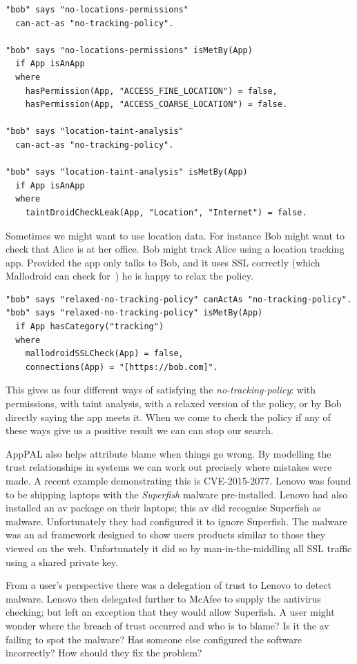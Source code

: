 \documentclass[]{llncs}
\begin{document}
\begin{lstlisting}
"bob" says "no-locations-permissions"
  can-act-as "no-tracking-policy".

"bob" says "no-locations-permissions" isMetBy(App)
  if App isAnApp
  where
    hasPermission(App, "ACCESS_FINE_LOCATION") = false,
    hasPermission(App, "ACCESS_COARSE_LOCATION") = false.

"bob" says "location-taint-analysis"
  can-act-as "no-tracking-policy".

"bob" says "location-taint-analysis" isMetBy(App)
  if App isAnApp
  where
    taintDroidCheckLeak(App, "Location", "Internet") = false.
\end{lstlisting}

Sometimes we might want to use location data.
For instance Bob might want to check that Alice is at her office.
Bob might track Alice using a location tracking app.
Provided the app only talks to Bob, and it uses SSL correctly (which Mallodroid can check for~\cite{Fahl:2012dj}) he is happy to relax the policy.

\begin{lstlisting}
"bob" says "relaxed-no-tracking-policy" canActAs "no-tracking-policy".
"bob" says "relaxed-no-tracking-policy" isMetBy(App)
  if App hasCategory("tracking")
  where
    mallodroidSSLCheck(App) = false,
    connections(App) = "[https://bob.com]".
\end{lstlisting}

This gives us four different ways of satisfying the \emph{no-tracking-policy}:
  with permissions,
  with taint analysis,
  with a relaxed version of the policy,
  or by Bob directly saying the app meets it.
When we come to check the policy if any of these ways give us a positive result we can can stop our search.

AppPAL also helps attribute blame when things go wrong.
By modelling the trust relationships in systems we can work out precisely where mistakes were made.
A recent example demonstrating this is \textsc{CVE-2015-2077}.
Lenovo was found to be shipping laptops with the \emph{Superfish} malware pre-installed.
Lenovo had also installed an \ac{av} package on their laptops; this \ac{av} did recognise Superfish as malware.
Unfortunately they had configured it to ignore Superfish.
The malware was an ad framework designed to show users products similar to those they viewed on the web.
Unfortunately it did so by man-in-the-middling all SSL traffic using a shared private key.

From a user's perspective there was a delegation of trust to Lenovo to detect malware.
Lenovo then delegated further to McAfee to supply the antivirus checking; but left an exception that they would allow Superfish.
A user might wonder where the breach of trust occurred and who is to blame?
Is it the \ac{av} failing to spot the malware?
Has someone else configured the software incorrectly?
How should they fix the problem?
\end{document}

